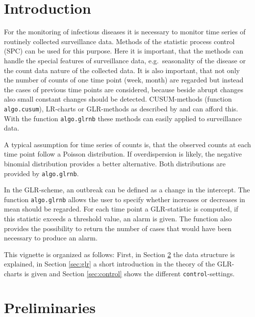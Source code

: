 \documentclass[a4paper,11pt]{article}
\begin{document}
\section{Introduction}\label{sec:intro}

For the monitoring of infectious diseases it is necessary to monitor time series of routinely collected surveillance data. Methods of the statistic process control (SPC) can be used for this purpose. Here it is important, that the methods can handle the special features of surveillance data, e.g.\ seasonality of the disease or the count data nature of the collected data. It is also important, that not only the number of counts of one time point (week, month) are regarded but instead the cases of previous time points are considered, because beside abrupt changes also small constant changes should be detected. CUSUM-methods (function \verb+algo.cusum+), LR-charts or GLR-methods as described by \citet{lai95} and \citet{hoehle2008} can afford this. With the function \verb+algo.glrnb+ these methods can easily applied to surveillance data.

A typical assumption for time series of counts is, that the observed counts at each time point follow a Poisson distribution. If overdispersion is likely, the negative binomial distribution provides a better alternative. Both distributions are provided by \verb+algo.glrnb+.

In the GLR-scheme, an outbreak can be defined as a change in the intercept. The function \verb+algo.glrnb+ allows the user to specify whether increases or decreases in mean should be regarded. For each time point a GLR-statistic is computed, if this statistic exceeds a threshold value, an alarm is given. The function also provides the possibility to return the number of cases that would have been necessary to produce an alarm.

This vignette is organized as follows: First, in Section \ref{sec:prel} the data structure is explained, in Section \ref{sec:glr} a short introduction in the theory of the GLR-charts is given and Section \ref{sec:control} shows the different \verb+control+-settings. %


\section{Preliminaries}\label{sec:prel}
\end{document}
